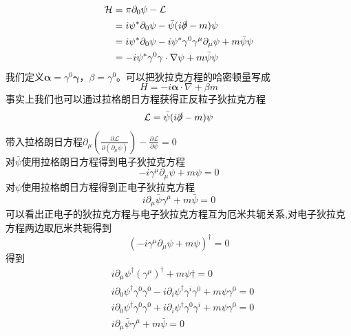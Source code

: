 \documentclass{article}
\numberwithin{equation}{subsection}
\begin{document}
    \begin{equation}
        \begin{split}
            \mathcal{H}&=\pi\partial_0\psi-\mathcal{L}\\
            &=i\psi^*\partial_0\psi-\bar{\psi}(i\slashed\partial-m)\psi\\
            &=i\psi^*\partial_0\psi-i\psi^*\gamma^0\gamma^\mu\partial_\mu\psi+m\bar{\psi}\psi\\
            &=-i\psi^*\gamma^0\mathbf{\gamma}\cdot\nabla\psi+m\bar{\psi}\psi
        \end{split}
    \end{equation}
    我们定义$\mathbf{\alpha}=\gamma^0\mathbf{\gamma}$，$\beta=\gamma^0$。可以把狄拉克方程的哈密顿量写成
    \begin{equation}
        H=-i\mathbf{\alpha}\cdot\nabla+\beta m
    \end{equation}
    事实上我们也可以通过拉格朗日方程获得正反粒子狄拉克方程
    \begin{equation}
        \mathcal{L}=\bar{\psi}(i\slashed\partial-m)\psi
    \end{equation}
    带入拉格朗日方程$\partial_\mu\left(\frac{\partial\mathcal{L}}{\partial(\partial_\mu\psi)}\right)-\frac{\partial\mathcal{L}}{\partial\psi}=0$\\
    对$\bar{\psi}$使用拉格朗日方程得到电子狄拉克方程
    \begin{equation}
        -i\gamma^\mu\partial_\mu\psi+m\psi=0
    \end{equation}
    对$\psi$使用拉格朗日方程得到正电子狄拉克方程
    \begin{equation}
        i\partial_\mu\bar{\psi}\gamma^\mu+m\bar{\psi}=0
    \end{equation}
    可以看出正电子的狄拉克方程与电子狄拉克方程互为厄米共轭关系,对电子狄拉克方程两边取厄米共轭得到
    \begin{equation}
        (-i\gamma^\mu\partial_\mu\psi+m\psi)^\dagger=0
    \end{equation}
    得到
    \begin{equation}
        \begin{split}
            &i\partial_\mu\psi^\dagger(\gamma^\mu)^\dagger+m\psi\dagger=0\\
            &i\partial_0\psi^\dagger\gamma^0\gamma^0-i\partial_i\psi^\dagger\gamma^i\gamma^0+m\psi\gamma^0=0\\
            &i\partial_0\psi^\dagger\gamma^0\gamma^0+i\partial_i\psi^\dagger\gamma^0\gamma^i+m\psi\gamma^0=0\\
            &i\partial_\mu\bar{\psi}\gamma^\mu+m\bar{\psi}=0
        \end{split}
    \end{equation}
\end{document}
